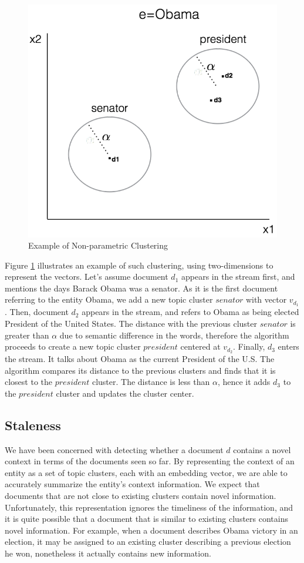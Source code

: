 \documentclass{sig-alternate}
\begin{document}
\begin{figure}[tb]
\centering
\includegraphics[width=0.7\columnwidth]{fig/obamaExample.pdf}
\caption{Example of Non-parametric Clustering}
\label{obama}
\end{figure}

Figure \ref{obama} illustrates an example of such clustering, using two-dimensions to represent the vectors.
Let's assume document $d_1$ appears in the stream first, and mentions the days Barack Obama was a senator. As it is the first document referring to the entity Obama, we add a new topic cluster $senator$ with vector $v_{d_1}$. 
Then, document $d_2$ appears in the stream, and refers to Obama as being elected President of the United States.
The distance with the previous cluster $senator$ is greater than $\alpha$ due to semantic difference in the words, therefore the algorithm proceeds to create a new topic cluster $president$ centered at $v_{d_2}$. 
Finally, $d_3$ enters the stream. 
It talks about Obama as the current President of the U.S. 
The algorithm compares its distance to the previous clusters and finds that it is closest to the $president$ cluster. 
The distance is less than $\alpha$, hence it adds $d_3$ to the $president$ cluster and updates the cluster center. 

\subsection{Staleness}
\label{staleness}

We have been concerned with detecting whether a document $d$ contains a novel context in terms of the documents seen so far.
By representing the context of an entity as a set of topic clusters, each with an embedding vector, we are able to accurately summarize the entity's context information. We expect that documents that are not close to existing clusters contain novel information.
Unfortunately, this representation ignores the timeliness of the information, and it is quite possible that a document that is similar to existing clusters contains novel information.
For example, when a document describes Obama victory in an election, it may be assigned to an existing cluster describing a previous election he won, nonetheless it actually contains new information.
\end{document}
